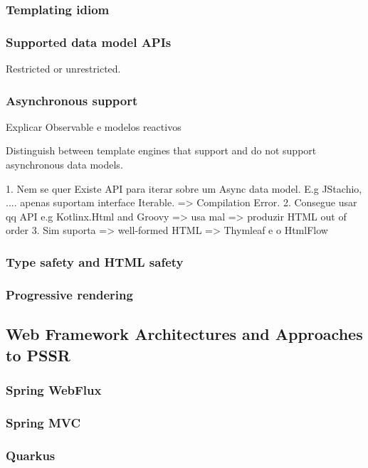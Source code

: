 \subsubsection{Templating idiom}

\subsubsection{Supported data model APIs}

Restricted or unrestricted.

\subsubsection{Asynchronous support}

Explicar Observable e modelos reactivos

Distinguish between template engines that support and do not support asynchronous data models.

1. Nem se quer Existe API para iterar sobre um Async data model. 
   E.g JStachio, .... apenas suportam interface Iterable. => Compilation Error.
2. Consegue usar qq API e.g Kotlinx.Html and Groovy  => usa mal => produzir HTML out of order
3. Sim suporta => well-formed HTML => Thymleaf e o HtmlFlow

\subsubsection{Type safety and HTML safety}

\subsubsection{Progressive rendering}


\subsection{Web Framework Architectures and Approaches to PSSR}

\subsubsection{Spring WebFlux}

\subsubsection{Spring MVC}

\subsubsection{Quarkus}